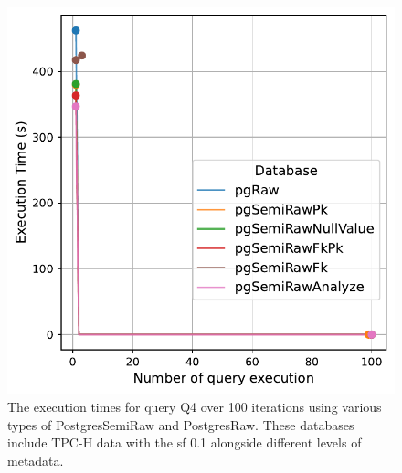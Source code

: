 \begin{figure}[hbt!]
\centering
\includegraphics[width=1.0\linewidth]{charts-eval-exp-time/execution_time_db_type_Q4.pdf}
\caption[Q4:result]{The execution times for query Q4 over 100 iterations using various types of PostgresSemiRaw and PostgresRaw. These databases include TPC-H data with the \acrshort{sf} 0.1 alongside different levels of metadata.}
\label{fig:execution_time_db_type_Q4}
\end{figure}
